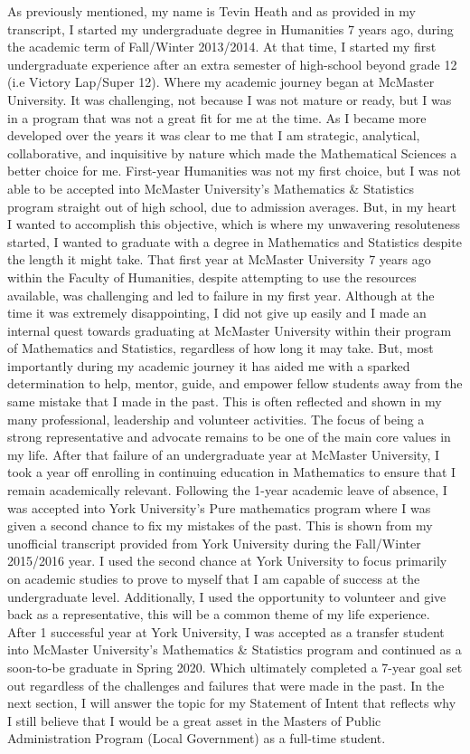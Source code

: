\documentclass[11pt, a4paper]{awesome-cv}
\begin{document}
\begin{cvletter}
As previously mentioned, my name is Tevin Heath and as provided in my transcript, I started my undergraduate degree in Humanities 7 years ago, during the academic term of Fall/Winter 2013/2014. At that time, I started my first undergraduate experience after an extra semester of high-school beyond grade 12 (i.e Victory Lap/Super 12). Where my academic journey began at McMaster University. It was challenging, not because I was not mature or ready, but I was in a program that was not a great fit for me at the time. As I became more developed over the years it was clear to me that I am strategic, analytical, collaborative, and inquisitive by nature which made the Mathematical Sciences a better choice for me. First-year Humanities was not my first choice, but I was not able to be accepted into McMaster University's Mathematics \& Statistics program straight out of high school, due to admission averages. But, in my heart I wanted to accomplish this objective, which is where my unwavering resoluteness started, I wanted to graduate with a degree in Mathematics and Statistics despite the length it might take. That first year at McMaster University 7 years ago within the Faculty of Humanities, despite attempting to use the resources available, was challenging and led to failure in my first year. Although at the time it was extremely disappointing, I did not give up easily and I made an internal quest towards graduating at McMaster University within their program of Mathematics and Statistics, regardless of how long it may take. But, most importantly during my academic journey it has aided me with a sparked determination to help, mentor, guide, and empower fellow students away from the same mistake that I made in the past. This is often reflected and shown in my many professional, leadership and volunteer activities. The focus of being a strong representative and advocate remains to be one of the main core values in my life. After that failure of an undergraduate year at McMaster University, I took a year off enrolling in continuing education in Mathematics to ensure that I remain academically relevant. Following the 1-year academic leave of absence, I was accepted into York University's Pure mathematics program where I was given a second chance to fix my mistakes of the past. This is shown from my unofficial transcript provided from York University during the Fall/Winter 2015/2016 year. I used the second chance at York University to focus primarily on academic studies to prove to myself that I am capable of success at the undergraduate level. Additionally, I used the opportunity to volunteer and give back as a representative, this will be a common theme of my life experience. After 1 successful year at York University, I was accepted as a transfer student into McMaster University's Mathematics \& Statistics program and continued as a soon-to-be graduate in Spring 2020. Which ultimately completed a 7-year goal set out regardless of the challenges and failures that were made in the past. In the next section, I will answer the topic for my Statement of Intent that reflects why I still believe that I would be a great asset in the Masters of Public Administration Program (Local Government) as a full-time student.


\end{cvletter}
\end{document}
